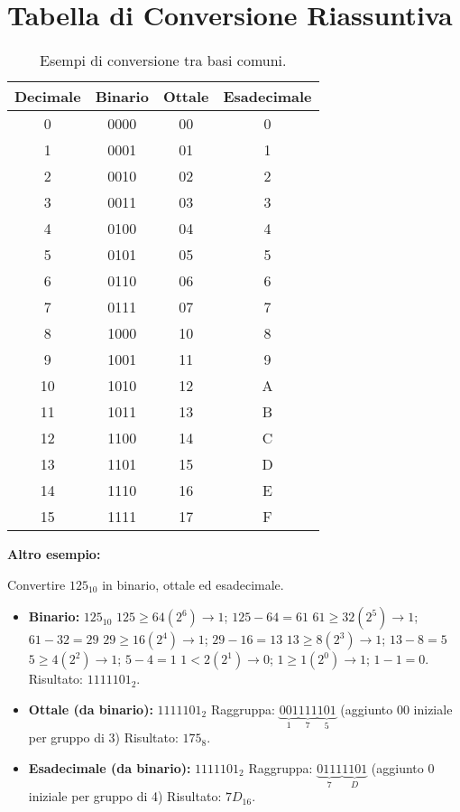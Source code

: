 \section{Tabella di Conversione Riassuntiva}
\begin{table}[H]
\centering
\caption{Esempi di conversione tra basi comuni.}
\begin{tabular}{cccc}
\toprule
\textbf{Decimale} & \textbf{Binario} & \textbf{Ottale} & \textbf{Esadecimale} \\
\midrule
0 & 0000 & 00 & 0 \\
1 & 0001 & 01 & 1 \\
2 & 0010 & 02 & 2 \\
3 & 0011 & 03 & 3 \\
4 & 0100 & 04 & 4 \\
5 & 0101 & 05 & 5 \\
6 & 0110 & 06 & 6 \\
7 & 0111 & 07 & 7 \\
8 & 1000 & 10 & 8 \\
9 & 1001 & 11 & 9 \\
10 & 1010 & 12 & A \\
11 & 1011 & 13 & B \\
12 & 1100 & 14 & C \\
13 & 1101 & 15 & D \\
14 & 1110 & 16 & E \\
15 & 1111 & 17 & F \\
\bottomrule
\end{tabular}
\label{tab:conversion_summary}
\end{table}

\textbf{Altro esempio:}

Convertire $125_{10}$ in binario, ottale ed esadecimale.
\begin{itemize}
    \item \textbf{Binario:} $125_{10}$
        $125 \ge 64 (2^6) \rightarrow 1$; $125-64 = 61$
        $61 \ge 32 (2^5) \rightarrow 1$; $61-32 = 29$
        $29 \ge 16 (2^4) \rightarrow 1$; $29-16 = 13$
        $13 \ge 8 (2^3) \rightarrow 1$; $13-8 = 5$
        $5 \ge 4 (2^2) \rightarrow 1$; $5-4 = 1$
        $1 < 2 (2^1) \rightarrow 0$;
        $1 \ge 1 (2^0) \rightarrow 1$; $1-1=0$.
        Risultato: $1111101_2$.
    \item \textbf{Ottale (da binario):} $1111101_2$
        Raggruppa: $\underbrace{001}_{1} \underbrace{111}_{7} \underbrace{101}_{5}$ (aggiunto 00 iniziale per gruppo di 3)
        Risultato: $175_8$.
    \item \textbf{Esadecimale (da binario):} $1111101_2$
        Raggruppa: $\underbrace{0111}_{7} \underbrace{1101}_{D}$ (aggiunto 0 iniziale per gruppo di 4)
        Risultato: $7D_{16}$.
\end{itemize}


